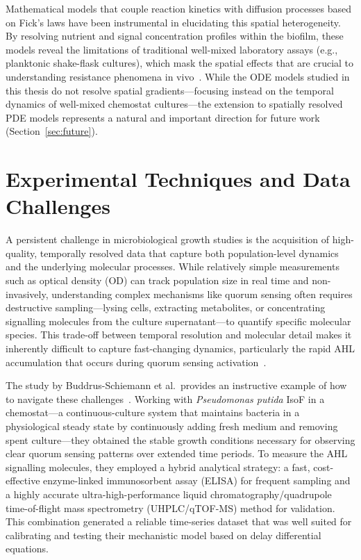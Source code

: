 \documentclass[14pt,a4paper,openany]{extbook}
\begin{document}
Mathematical models that couple reaction kinetics with diffusion processes based on Fick's laws have been instrumental in elucidating this spatial heterogeneity. By resolving nutrient and signal concentration profiles within the biofilm, these models reveal the limitations of traditional well-mixed laboratory assays (e.g., planktonic shake-flask cultures), which mask the spatial effects that are crucial to understanding resistance phenomena in vivo~\cite{kuttler2017reaction, wang2022mathematical}. While the ODE models studied in this thesis do not resolve spatial gradients---focusing instead on the temporal dynamics of well-mixed chemostat cultures---the extension to spatially resolved PDE models represents a natural and important direction for future work (Section~\ref{sec:future}).


\section{Experimental Techniques and Data Challenges}
\label{sec:experiments}

A persistent challenge in microbiological growth studies is the acquisition of high-quality, temporally resolved data that capture both population-level dynamics and the underlying molecular processes. While relatively simple measurements such as optical density (OD) can track population size in real time and non-invasively, understanding complex mechanisms like quorum sensing often requires destructive sampling---lysing cells, extracting metabolites, or concentrating signalling molecules from the culture supernatant---to quantify specific molecular species. This trade-off between temporal resolution and molecular detail makes it inherently difficult to capture fast-changing dynamics, particularly the rapid AHL accumulation that occurs during quorum sensing activation~\cite{maier2015}.

The study by Buddrus-Schiemann et al.\ provides an instructive example of how to navigate these challenges~\cite{buddrus2014analysis}. Working with \textit{Pseudomonas putida} IsoF in a chemostat---a continuous-culture system that maintains bacteria in a physiological steady state by continuously adding fresh medium and removing spent culture---they obtained the stable growth conditions necessary for observing clear quorum sensing patterns over extended time periods. To measure the AHL signalling molecules, they employed a hybrid analytical strategy: a fast, cost-effective enzyme-linked immunosorbent assay (ELISA) for frequent sampling and a highly accurate ultra-high-performance liquid chromatography/quadrupole time-of-flight mass spectrometry (UHPLC/qTOF-MS) method for validation. This combination generated a reliable time-series dataset that was well suited for calibrating and testing their mechanistic model based on delay differential equations.
\end{document}

